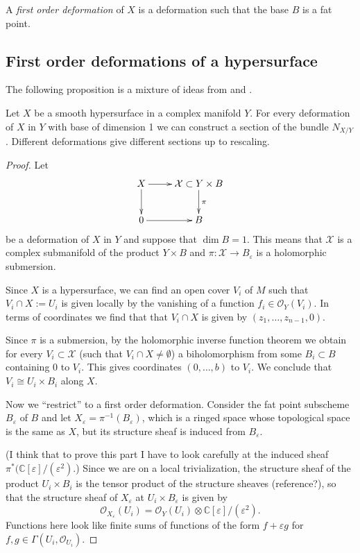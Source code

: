 {\begin{definition}
A {\it first order deformation} of $X$ is a
deformation such that
the base $B$ is a fat point.
\end{definition}

\subsection{First order deformations of a
hypersurface}
\label{subsection-deformations-hypersurface}

The following proposition is a
mixture of ideas from \cite[p. 224]{voi}
and \cite[Examples
3.2.4(ii)]{Sernesi-deformations}.

\begin{proposition}
\label{proposition-kodai-spenc-embed-defor}
Let $X$ be a smooth hypersurface in a complex
manifold $Y$.
For every deformation of $X$ in $Y$
with base of dimension 1 we can construct a
section of the bundle
$N_{X/Y}$. Different deformations give
different sections up to rescaling.
\end{proposition}

\begin{proof}
Let
$$
\xymatrix{
X\ar[r]\ar[d]
&\mathcal{X}\subset Y\times B\ar[d]^\pi\\
0\ar[r]
&B
}
$$
be a deformation of $X$ in $Y$
and suppose that $\dim B=1$.
This means that $\mathcal{X}$ is a complex
submanifold of
the product $Y \times B$
and $\pi:\mathcal{X} \to B_\varepsilon$ is
a holomorphic submersion.

Since $X$ is a hypersurface,
we can find an open cover $V_i$
of $M$ such that $V_i \cap X:= U_i$
is given locally by the vanishing of
a function $f_i \in \mathcal{O}_Y(V_i)$.
In terms of coordinates we find that
that $V_i \cap X$ is given by
$(z_1,…,z_{n-1},0)$.

Since $\pi$ is a submersion,
by the holomorphic inverse function theorem
we obtain for every $V_i \subset \mathcal{X}$
(such that $V_i \cap X \neq  \emptyset$)
a biholomorphism from some $B_i \subset B$
containing $0$ to $V_i$.
This gives coordinates $(0,…,b)$ to $V_i$.
We conclude that $V_i \cong U_i\times B_i$
along $X$.

Now we ``restrict'' to a first order
deformation.
Consider the fat point subscheme
$B_\varepsilon$ of $B$
and let
$X_\varepsilon=\pi^{-1}(B_\varepsilon)$,
which is a ringed space whose topological
space
is the same as $X$, but its
structure sheaf is induced from
$B_\varepsilon$.

(I think that to prove this part I have
to look carefully at the induced sheaf
$\pi^*(\mathbb{C}[\varepsilon]/
(\varepsilon^2)$.)
Since we are on a local trivialization,
the structure sheaf of the product $U_i
\times B_i$
is the tensor product of the structure
sheaves
(reference?),
so that the structure sheaf of
$X_\varepsilon$ at
$U_i\times B_\varepsilon$ is given by
$$
\mathcal{O}_{X_\varepsilon}(U_i)=
 \mathcal{O}_Y(U_i) \otimes
 \mathbb{C}[\varepsilon]/(\varepsilon^2).
$$
Functions here look like finite sums of
functions of the form $f+ \varepsilon g$ for
$f,g \in \Gamma(U_i,\mathcal{O}_{U_i})$.


\end{proof}}
